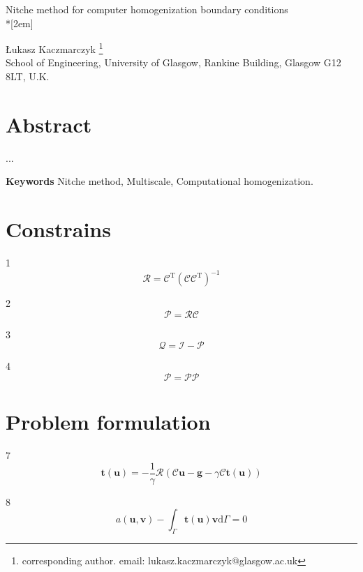 \documentclass[a4paper,12pt]{article}
\begin{document}
\begin{center}

{\Large  Nitche method for computer homogenization boundary conditions}\\*[2em]

{\L}ukasz Kaczmarczyk \footnote{corresponding
author. email: lukasz.kaczmarczyk@glasgow.ac.uk} \\
School of Engineering, University of
Glasgow, Rankine Building, Glasgow G12 8LT, U.K.
\end{center}

\section*{Abstract}

...

{\bf Keywords} Nitche method, Multiscale, Computational homogenization.

\section{Constrains}

1
\begin{equation}
\mathcal{R} = \mathcal{C}^\textrm{T}(\mathcal{C}\mathcal{C}^\textrm{T})^{-1}
\end{equation}

2
\begin{equation}
\mathcal{P} = \mathcal{R}\mathcal{C}
\end{equation}

3
\begin{equation}
\mathcal{Q} = \mathcal{I}-\mathcal{P}
\end{equation}

4
\begin{equation}
\mathcal{P} = \mathcal{P}\mathcal{P}
\end{equation}

\section{Problem formulation}

7
\begin{equation}
\mathbf{t}(\mathbf{u}) =
-\frac{1}{\gamma}
\mathcal{R}(\mathcal{C}\mathbf{u}-\mathbf{g}-\gamma\mathcal{C}\mathbf{t}(\mathbf{u}))
\end{equation}

8
\begin{equation}
a(\mathbf{u},\mathbf{v}) - \int_\Gamma \mathbf{t}(\mathbf{u})\mathbf{v} \textrm{d}\Gamma = 0
\end{equation}
\end{document}
